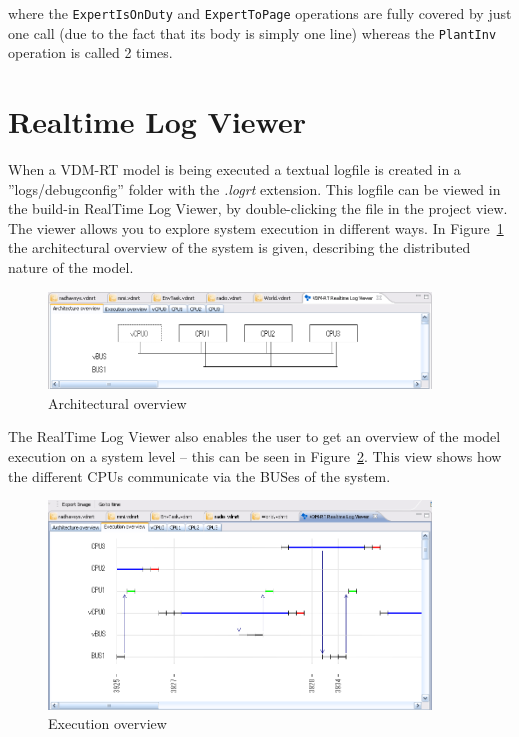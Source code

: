\noindent where the \texttt{ExpertIsOnDuty} and \texttt{ExpertToPage} 
operations are fully covered
by just one call (due to the fact that its body is simply one line)
whereas the \texttt{PlantInv} operation is called 2 times.

\section{Realtime Log Viewer}\label{sec:RTLV}

When a VDM-RT model is being executed a textual logfile is created in
a ''logs/debugconfig'' folder with the \emph{.logrt} extension. This
logfile can be viewed in the build-in RealTime Log Viewer, by
double-clicking the file in the project view. The viewer allows you to
explore system execution in different ways. In
Figure~\ref{fig:userguide:ArchitecturalOverview} the architectural
overview of the system is given, describing the distributed nature of
the model.

\begin{figure}[htp]
\begin{center}
  \includegraphics[width=4in]{figures/ArchitectureOverview}
  \caption{Architectural overview}
  \label{fig:userguide:ArchitecturalOverview}
\end{center}
\end{figure}

The RealTime Log Viewer also enables the user to get an overview of
the model execution on a system level -- this can be seen in
Figure~\ref{fig:userguide:ExecutionOverview}. This view shows how the
different CPUs communicate via the BUSes of the system.

\begin{figure}[htp]
\begin{center}
  \includegraphics[width=4in]{figures/ExecutionOverview}
  \caption{Execution overview}
  \label{fig:userguide:ExecutionOverview}
\end{center}
\end{figure}

